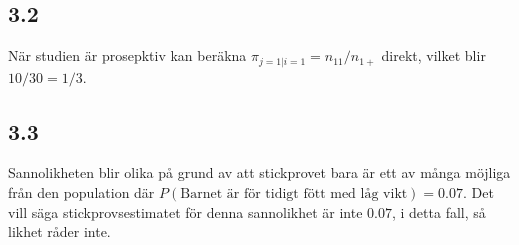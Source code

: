 \documentclass[]{article}
\begin{document}
\hypertarget{section-5}{%
\subsection{3.2}\label{section-5}}

När studien är prosepktiv kan beräkna
\(\widehat{\pi}_{j = 1| i = 1} = n_{11}/n_{1+}\) direkt, vilket blir
\(10/30 = 1/3\).

\hypertarget{section-6}{%
\subsection{3.3}\label{section-6}}

Sannolikheten blir olika på grund av att stickprovet bara är ett av
många möjliga från den population där
\(P(\text{Barnet är för tidigt fött med låg vikt})=0.07\). Det vill säga
stickprovsestimatet för denna sannolikhet är inte \(0.07\), i detta
fall, så likhet råder inte.
\end{document}

